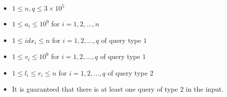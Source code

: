 \begin{itemize}
    \tightlist
    \item $1 \leq n, q \leq 3 \times 10^5$
    \item $1 \leq a_i \leq 10^9$ for $i = 1, 2, \ldots, n$
    \item $1 \leq idx_i \leq n$ for $i = 1, 2, \ldots, q$ of query type $1$
    \item $1 \leq v_i \leq 10^9$ for $i = 1, 2, \ldots, q$ of query type $1$
    \item $1 \leq l_i \leq r_i \leq n$ for $i = 1, 2, \ldots, q$ of query type $2$
    \item It is guaranteed that there is at least one query of type $2$ in the input.
\end{itemize}
    